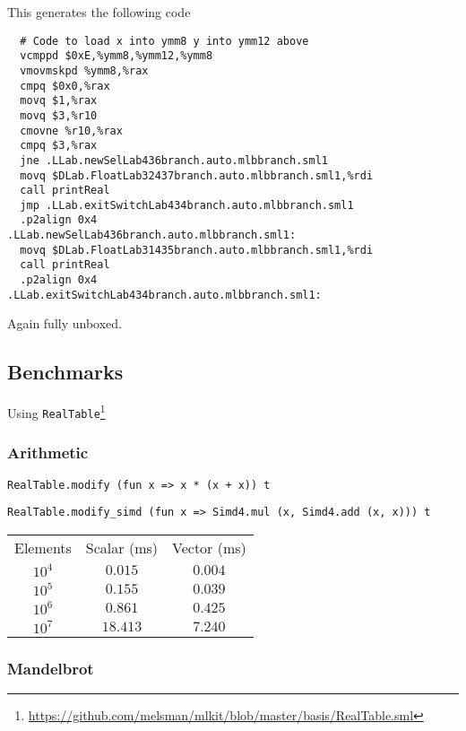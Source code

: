 \documentclass{article}
\begin{document}
This generates the following code

\begin{verbatim}
  # Code to load x into ymm8 y into ymm12 above
  vcmppd $0xE,%ymm8,%ymm12,%ymm8
  vmovmskpd %ymm8,%rax
  cmpq $0x0,%rax
  movq $1,%rax
  movq $3,%r10
  cmovne %r10,%rax
  cmpq $3,%rax
  jne .LLab.newSelLab436branch.auto.mlbbranch.sml1
  movq $DLab.FloatLab32437branch.auto.mlbbranch.sml1,%rdi
  call printReal
  jmp .LLab.exitSwitchLab434branch.auto.mlbbranch.sml1
  .p2align 0x4
.LLab.newSelLab436branch.auto.mlbbranch.sml1:
  movq $DLab.FloatLab31435branch.auto.mlbbranch.sml1,%rdi
  call printReal
  .p2align 0x4
.LLab.exitSwitchLab434branch.auto.mlbbranch.sml1:
\end{verbatim}

Again fully unboxed.

\subsection{Benchmarks}

Using \texttt{RealTable}\footnote{\url{https://github.com/melsman/mlkit/blob/master/basis/RealTable.sml}}

\subsubsection{Arithmetic}

\begin{lstlisting}
RealTable.modify (fun x => x * (x + x)) t
\end{lstlisting}

\begin{lstlisting}
RealTable.modify_simd (fun x => Simd4.mul (x, Simd4.add (x, x))) t
\end{lstlisting}

\begin{center}
\begin{tabular}{ c c c }
    Elements & Scalar (ms) & Vector (ms) \\
    $10^4$ & $0.015$ & $0.004$ \\
    $10^5$ & $0.155$ & $0.039$ \\
    $10^6$ & $0.861$ & $0.425$ \\
    $10^7$ & $18.413$ & $7.240$
\end{tabular}
\end{center}

\subsubsection{Mandelbrot}
\end{document}
